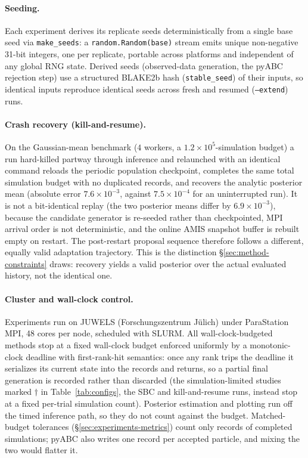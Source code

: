 \documentclass[10pt]{article}
\theoremstyle{plain}
\theoremstyle{definition}
\begin{document}
\paragraph{Seeding.} Each experiment derives its replicate seeds deterministically from a single base seed via \texttt{make\_seeds}: a \texttt{random.Random(base)} stream emits unique non-negative 31-bit integers, one per replicate, portable across platforms and independent of any global RNG state. Derived seeds (observed-data generation, the pyABC rejection step) use a structured BLAKE2b hash (\texttt{stable\_seed}) of their inputs, so identical inputs reproduce identical seeds across fresh and resumed (\texttt{--extend}) runs.

\paragraph{Crash recovery (kill-and-resume).} On the Gaussian-mean benchmark ($4$ workers, a $1.2\times10^{5}$-simulation budget) a run hard-killed partway through inference and relaunched with an identical command reloads the periodic population checkpoint, completes the same total simulation budget with no duplicated records, and recovers the analytic posterior mean (absolute error $7.6\times10^{-3}$, against $7.5\times10^{-4}$ for an uninterrupted run). It is not a bit-identical replay (the two posterior means differ by $6.9\times10^{-3}$), because the candidate generator is re-seeded rather than checkpointed, MPI arrival order is not deterministic, and the online AMIS snapshot buffer is rebuilt empty on restart. The post-restart proposal sequence therefore follows a different, equally valid adaptation trajectory. This is the distinction \S\ref{sec:method-constraints} draws: recovery yields a valid posterior over the actual evaluated history, not the identical one.

\paragraph{Cluster and wall-clock control.} Experiments run on JUWELS (Forschungszentrum J\"ulich) under ParaStation MPI, 48 cores per node, scheduled with SLURM. All wall-clock-budgeted methods stop at a fixed wall-clock budget enforced uniformly by a monotonic-clock deadline with first-rank-hit semantics: once any rank trips the deadline it serializes its current state into the records and returns, so a partial final generation is recorded rather than discarded (the simulation-limited studies marked $\dagger$ in Table~\ref{tab:configs}, the SBC and kill-and-resume runs, instead stop at a fixed per-trial simulation count). Posterior estimation and plotting run off the timed inference path, so they do not count against the budget. Matched-budget tolerances (\S\ref{sec:experiments-metrics}) count only records of completed simulations; pyABC also writes one record per accepted particle, and mixing the two would flatter it.
\end{document}
